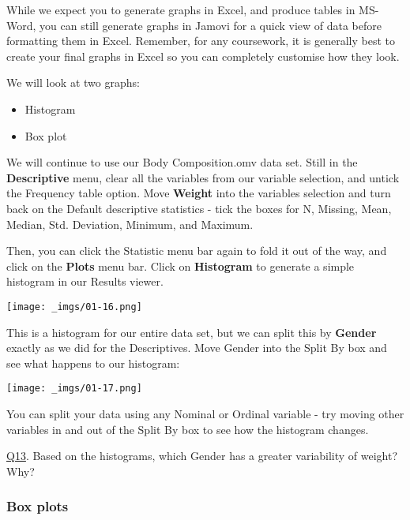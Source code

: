 \documentclass[
  letterpaper,
  DIV=11,
  numbers=noendperiod]{scrartcl}
\providecommand{\tightlist}{%
  \setlength{\itemsep}{0pt}\setlength{\parskip}{0pt}}\usepackage{longtable,booktabs,array}
\begin{document}
While we expect you to generate graphs in Excel, and produce tables in
MS-Word, you can still generate graphs in Jamovi for a quick view of
data before formatting them in Excel. Remember, for any coursework, it
is generally best to create your final graphs in Excel so you can
completely customise how they look.

We will look at two graphs:

\begin{itemize}
\tightlist
\item
  Histogram
\item
  Box plot
\end{itemize}

We will continue to use our Body Composition.omv data set. Still in the
\textbf{Descriptive} menu, clear all the variables from our variable
selection, and untick the Frequency table option. Move \textbf{Weight}
into the variables selection and turn back on the Default descriptive
statistics - tick the boxes for N, Missing, Mean, Median, Std.
Deviation, Minimum, and Maximum.

Then, you can click the Statistic menu bar again to fold it out of the
way, and click on the \textbf{Plots} menu bar. Click on
\textbf{Histogram} to generate a simple histogram in our Results viewer.

\texttt{[image: \_imgs/01-16.png]}

This is a histogram for our entire data set, but we can split this by
\textbf{Gender} exactly as we did for the Descriptives. Move Gender into
the Split By box and see what happens to our histogram:

\texttt{[image: \_imgs/01-17.png]}

You can split your data using any Nominal or Ordinal variable - try
moving other variables in and out of the Split By box to see how the
histogram changes.

\begin{tcolorbox}[beforeafter skip=1cm, ignore nobreak=true, breakable, colframe=Questions-frame, colback=Questions-bg, coltext=Questions-text, boxsep=2mm, arc=0mm, boxrule=0.5mm]

\protect\hypertarget{Q13}{\protect\hyperlink{A13}{Q13}}. Based on the
histograms, which Gender has a greater variability of weight? Why?

\end{tcolorbox}

\hypertarget{box-plots}{%
\subsubsection{Box plots}\label{box-plots}}
\end{document}

